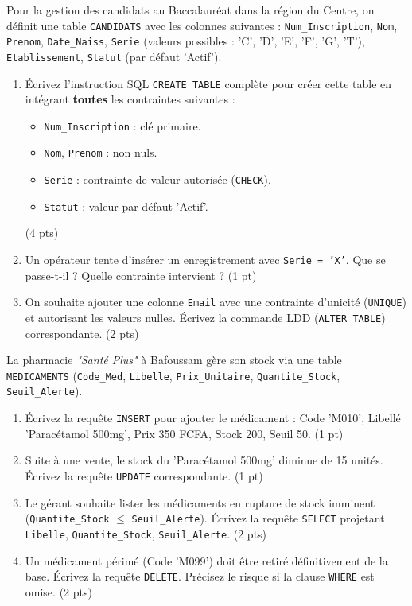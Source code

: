\documentclass[11pt]{article}
\begin{document}
\begin{exercice}
Pour la gestion des candidats au Baccalauréat dans la région du Centre, on définit une table \texttt{CANDIDATS} avec les colonnes suivantes : \texttt{Num\_Inscription}, \texttt{Nom}, \texttt{Prenom}, \texttt{Date\_Naiss}, \texttt{Serie} (valeurs possibles : 'C', 'D', 'E', 'F', 'G', 'T'), \texttt{Etablissement}, \texttt{Statut} (par défaut 'Actif').
\begin{enumerate}
    \item Écrivez l'instruction SQL \texttt{CREATE TABLE} complète pour créer cette table en intégrant \textbf{toutes} les contraintes suivantes :
    \begin{itemize}
        \item \texttt{Num\_Inscription} : clé primaire.
        \item \texttt{Nom}, \texttt{Prenom} : non nuls.
        \item \texttt{Serie} : contrainte de valeur autorisée (\texttt{CHECK}).
        \item \texttt{Statut} : valeur par défaut 'Actif'.
    \end{itemize}
    (4 pts)
    \item Un opérateur tente d'insérer un enregistrement avec \texttt{Serie = 'X'}. Que se passe-t-il ? Quelle contrainte intervient ? (1 pt)
    \item On souhaite ajouter une colonne \texttt{Email} avec une contrainte d'unicité (\texttt{UNIQUE}) et autorisant les valeurs nulles. Écrivez la commande LDD (\texttt{ALTER TABLE}) correspondante. (2 pts)
\end{enumerate}
\end{exercice}

\begin{exercice}
La pharmacie \textit{"Santé Plus"} à Bafoussam gère son stock via une table \texttt{MEDICAMENTS} (\texttt{Code\_Med}, \texttt{Libelle}, \texttt{Prix\_Unitaire}, \texttt{Quantite\_Stock}, \texttt{Seuil\_Alerte}).
\begin{enumerate}
    \item Écrivez la requête \texttt{INSERT} pour ajouter le médicament : Code 'M010', Libellé 'Paracétamol 500mg', Prix 350 FCFA, Stock 200, Seuil 50. (1 pt)
    \item Suite à une vente, le stock du 'Paracétamol 500mg' diminue de 15 unités. Écrivez la requête \texttt{UPDATE} correspondante. (1 pt)
    \item Le gérant souhaite lister les médicaments en rupture de stock imminent (\texttt{Quantite\_Stock} $\le$ \texttt{Seuil\_Alerte}). Écrivez la requête \texttt{SELECT} projetant \texttt{Libelle}, \texttt{Quantite\_Stock}, \texttt{Seuil\_Alerte}. (2 pts)
    \item Un médicament périmé (Code 'M099') doit être retiré définitivement de la base. Écrivez la requête \texttt{DELETE}. Précisez le risque si la clause \texttt{WHERE} est omise. (2 pts)
\end{enumerate}
\end{exercice}
\end{document}
